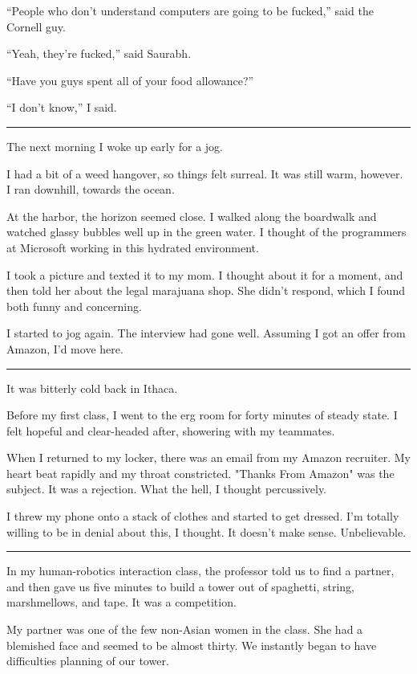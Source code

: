 ``People who don't understand computers are going to be fucked,''
said the Cornell guy.

``Yeah, they're fucked,'' said Saurabh.  

``Have you guys spent all of your food allowance?''

``I don't know,'' I said.

\plainfancybreak{12pt}{2}{* * *}

The next morning I woke up early for a jog.

I had a bit of a weed hangover, so things felt surreal.  It was still warm,
however.  I ran downhill, towards the ocean.

At the harbor, the horizon seemed close.  I walked along the boardwalk and
watched glassy bubbles well up in the green water.  I thought of the programmers
at Microsoft working in this hydrated environment. 

I took a picture and texted it to my mom.  I thought about it for a moment, and
then told her about the legal marajuana shop.  She didn't respond, which I found
both funny and concerning. 

I started to jog again.  The interview had gone well.  Assuming I got an
offer from Amazon, I'd move here. 

\plainfancybreak{12pt}{2}{* * *}

It was bitterly cold back in Ithaca.

Before my first class, I went to the erg room for forty minutes of steady state.
I felt hopeful and clear-headed after, showering with my teammates.

When I returned to my locker, there was an email from my Amazon recruiter.  My
heart beat rapidly and my throat constricted.  "Thanks From Amazon" was the
subject.  It was a rejection.  What the hell, I thought percussively. 

I threw my phone onto a stack of clothes and started to get dressed.  I'm
totally willing to be in denial about this, I thought.  It doesn't make sense.
Unbelievable. 

\plainfancybreak{12pt}{2}{* * *}

In my human-robotics interaction class, the professor told us to find a partner,
and then gave us five minutes to build a tower out of spaghetti, string,
marshmellows, and tape.  It was a competition.

My partner was one of the few non-Asian women in the class.  She had a blemished
face and seemed to be almost thirty.  We instantly began to have difficulties
planning of our tower.  


